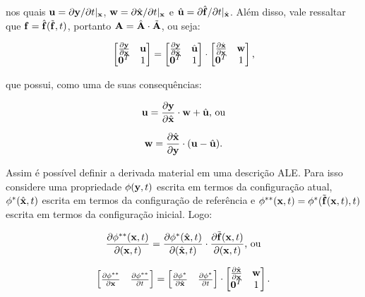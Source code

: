 \noindent nos quais $\mathbf{u}=\partial\mathbf{y}/\partial t|_{\mathbf{x}}$, $\mathbf{w}=\partial\hat{\mathbf{x}}/\partial t|_{\mathbf{x}}$ e $\hat{\mathbf{u}}=\partial\hat{\mathbf{f}}/\partial t|_{\hat{\mathbf{x}}}$. Além disso, vale ressaltar que $\mathbf{f}=\hat{\mathbf{f}}(\tilde{\mathbf{f}},t)$, portanto $\mathbf{A}=\hat{\mathbf{A}}\cdot\tilde{\mathbf{A}}$, ou seja:

\begin{equation}
    \begin{bmatrix}\frac{\partial{\mathbf{y}}}{\partial{\mathbf{x}}}&\mathbf{u}\\\mathbf{0}^T&1\end{bmatrix}=
    \begin{bmatrix}\frac{\partial{\mathbf{y}}}{\partial{\hat{\mathbf{x}}}}&\hat{\mathbf{u}}\\\mathbf{0}^T&1\end{bmatrix}\cdot
    \begin{bmatrix}\frac{\partial{\hat{\mathbf{x}}}}{\partial{\mathbf{x}}}&\mathbf{w}\\\mathbf{0}^T&1\end{bmatrix}\text{,}
    \label{F4}
\end{equation}

\noindent que possui, como uma de suas consequências:

\begin{equation}
    \mathbf{u}=\frac{\partial{\mathbf{y}}}{\partial{\hat{\mathbf{x}}}}\cdot\mathbf{w}+\hat{\mathbf{u}}\text{, ou}
    \label{u1}
\end{equation}

\begin{equation}
    \mathbf{w}=\frac{\partial{\hat{\mathbf{x}}}}{\partial{\mathbf{y}}}\cdot(\mathbf{u}-\hat{\mathbf{u}})\text{.}
    \label{w1}
\end{equation}

Assim é possível definir a derivada material em uma descrição ALE. Para isso considere uma propriedade $\phi(\mathbf{y},t)$ escrita em termos da configuração atual, $\phi^*(\hat{\mathbf{x}},t)$ escrita em termos da configuração de referência e $\phi^{**}(\mathbf{x},t)=\phi^*(\tilde{\mathbf{f}}(\mathbf{x},t),t)$ escrita em termos da configuração inicial. Logo:

\begin{equation}
    \frac{\partial{\phi^{**}(\mathbf{x},t)}}{\partial{(\mathbf{x},t)}}=\frac{\partial{\phi^*(\hat{\mathbf{x}},t)}}{\partial{(\hat{\mathbf{x}},t)}}\cdot\frac{\partial{\tilde{\mathbf{f}}(\mathbf{x},t)}}{\partial{(\mathbf{x},t)}}\text{, ou}
    \label{phi1}
\end{equation}

\begin{equation}
    \begin{bmatrix}\frac{\partial{\phi^{**}}}{\partial{\mathbf{x}}}&\frac{\partial{\phi^{**}}}{\partial{t}}\end{bmatrix}=
    \begin{bmatrix}\frac{\partial{\phi^{*}}}{\partial{\hat{\mathbf{x}}}}&\frac{\partial{\phi^{*}}}{\partial{t}}\end{bmatrix}\cdot
    \begin{bmatrix}\frac{\partial{\hat{\mathbf{x}}}}{\partial{\mathbf{x}}}&\mathbf{w}\\\mathbf{0}^T&1\end{bmatrix}
    \text{.}
    \label{phi2}
\end{equation}

